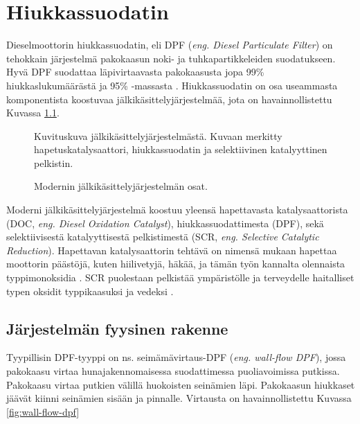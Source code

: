 \chapter{Hiukkassuodatin}%
\label{ch:dpf}



Dieselmoottorin hiukkassuodatin, eli DPF (\emph{eng. Diesel Particulate Filter}) on tehokkain järjestelmä pakokaasun noki- ja tuhkapartikkeleiden suodatukseen. 
Hyvä DPF suodattaa läpivirtaavasta pakokaasusta jopa 99\% hiukkaslukumäärästä ja 95\% -massasta \cite{Yan_state_of_the_art}. Hiukkassuodatin on osa useammasta komponentista koostuvaa jälkikäsittelyjärjestelmää, jota on havainnollistettu Kuvassa \ref{fig:EAT_full}. %

\begin{figure}[H]
    \centering
                {Kuvituskuva jälkikäsittelyjärjestelmästä. Kuvaan merkitty hapetuskatalysaattori, hiukkassuodatin ja selektiivinen katalyyttinen pelkistin.}
    \caption{Modernin jälkikäsittelyjärjestelmän osat.}
    \label{fig:EAT_full}
\end{figure}

Moderni jälkikäsittelyjärjestelmä koostuu yleensä hapettavasta katalysaattorista (DOC, \emph{eng. Diesel Oxidation Catalyst}), hiukkassuodattimesta (DPF), sekä selektiivisestä katalyyttisestä pelkistimestä (SCR, \emph{eng. Selective Catalytic Reduction}). Hapettavan katalysaattorin tehtävä on nimensä mukaan hapettaa moottorin päästöjä, kuten hiilivetyjä, häkää, ja tämän työn kannalta olennaista typpimonoksidia \cite{dieselnet_doc}. SCR puolestaan pelkistää ympäristölle ja terveydelle haitalliset typen oksidit typpikaasuksi ja vedeksi \cite{dieselnet_scr}.



\section{Järjestelmän fyysinen rakenne}

Tyypillisin DPF-tyyppi on ns. seimämävirtaus-DPF (\emph{eng. wall-flow DPF}), jossa pakokaasu virtaa hunajakennomaisessa suodattimessa puoliavoimissa putkissa. Pakokaasu virtaa putkien välillä huokoisten seinämien läpi. Pakokaasun hiukkaset jäävät kiinni seinämien sisään ja pinnalle. Virtausta on havainnollistettu Kuvassa \ref{fig:wall-flow-dpf}  


